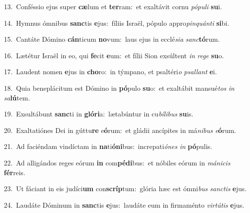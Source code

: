 {\numbfont\textcolor{\numbcolor}{13.}}~Conféssio ejus super \textbf{cæ}\-lum et \textbf{ter}\-ram:~\star et exaltávit cornu \textit{pó}\-\textit{pu}\textit{li} \textbf{su}\-i.\par
{\numbfont\textcolor{\numbcolor}{14.}}~Hymnus ómnibus \textbf{sanc}\-tis \textbf{e}\-jus:~\star fíliis Israël, pópulo appro\-\textit{pin}\-\textit{quán}\textit{ti} \textbf{si}\-bi.\par
{\numbfont\textcolor{\numbcolor}{15.}}~Cantáte Dómino \textbf{cán}\-ticum \textbf{no}\-vum:~\star laus ejus in ecclé\-\textit{si}\-\textit{a} \textit{sanc}\-\textbf{tó}rum.\par
{\numbfont\textcolor{\numbcolor}{16.}}~Lætétur Israël in eo, qui \textbf{fe}\-cit \textbf{e}\-um:~\star et fílii Sion exsúltent \textit{in} \textit{re}\-\textit{ge} \textbf{su}\-o.\par
{\numbfont\textcolor{\numbcolor}{17.}}~Laudent nomen \textbf{e}\-jus in \textbf{cho}\-ro:~\star in týmpano, et psaltéri\textit{o} \textit{psal}\-\textit{lant} \textbf{e}\-i.\par
{\numbfont\textcolor{\numbcolor}{18.}}~Quia beneplácitum est Dómino in \textbf{pó}\-pulo \textbf{su}\-o:~\star et exaltábit mansué\textit{tos} \textit{in} \textit{sa}\-\textbf{lú}tem.\par
{\numbfont\textcolor{\numbcolor}{19.}}~Exsultábunt \textbf{sanc}\-ti in \textbf{gló}\-\textbf{ri}a:~\star lætabúntur in cu\-\textit{bí}\-\textit{li}\textit{bus} \textbf{su}\-is.\par
{\numbfont\textcolor{\numbcolor}{20.}}~Exaltatiónes Dei in gúttu\textbf{re} e\-\textbf{ó}\-rum:~\star et gládii ancípites in má\-\textit{ni}\-\textit{bus} \textit{e}\-\textbf{ó}rum.\par
{\numbfont\textcolor{\numbcolor}{21.}}~Ad faciéndam vindíctam in \textbf{na}\-ti\-\textbf{ó}\-\textbf{ni}bus:~\star increpati\-\textit{ó}\-\textit{nes} \textit{in} \textbf{pó}\-pulis.\par
{\numbfont\textcolor{\numbcolor}{22.}}~Ad alligándos reges eórum \textbf{in} com\-\textbf{pé}\-\textbf{di}bus:~\star et nóbiles eórum in \textit{má}\-\textit{ni}\textit{cis} \textbf{fér}\-reis.\par
{\numbfont\textcolor{\numbcolor}{23.}}~Ut fáciant in eis judíci\textbf{um} con\-\textbf{scríp}\-tum:~\star glória hæc est ómni\textit{bus} \textit{sanc}\-\textit{tis} \textbf{e}\-jus.\par
{\numbfont\textcolor{\numbcolor}{24.}}~Laudáte Dóminum in \textbf{sanc}\-tis \textbf{e}\-jus:~\star laudáte eum in firmaménto \textit{vir}\-\textit{tú}\textit{tis} \textbf{e}\-jus.\par
